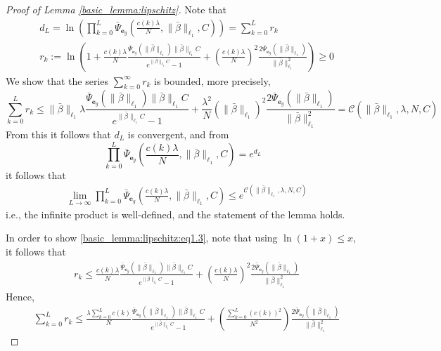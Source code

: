 \documentclass[10pt,a4paper]{amsart}
\def\rve{{\mathbf{e}}}
\begin{document}
\begin{proof}[Proof of Lemma \ref{basic_lemma:lipschitz}]
        Note that 
        \[
        \begin{aligned}
        &  d_L=\ln\left(\prod_{k=0}^{L} \bar{\Psi}_{\rve_g}\left(\frac{c(k) \lambda}{N},\|\bar{\beta}\|_{\ell_1},C\right) \right)=\sum_{k=0}^{L} r_k \\
        & r_k:=\ln \left(1+\frac{c(k) \lambda}{N} \frac{\bar{\Psi}_{\rve_g}(\|\bar{\beta}\|_{\ell_1})\|\bar{\beta}\|_{\ell_1}C}{e^{\|\bar{\beta}\|_{\ell_1}C}-1} + \left(\frac{c(k) \lambda}{N}\right)^2 \frac{2\bar{\Psi}_{\rve_g}(\|\bar{\beta}\|_{\ell_1})}{\|\bar{\beta}\|_{\ell_1}^2} \right) \geq 0
        \end{aligned}
        \]
        We show that the series $\sum_{k=0}^{\infty} r_k$ 
        is bounded, more precisely, 
        \[
        \sum_{k=0}^{L} r_k \le 
      \|\bar{\beta}\|_{\ell_1} \lambda \frac{\bar{\Psi}_{\rve_g}(\|\bar{\beta}\|_{\ell_1})\|\bar{\beta}\|_{\ell_1}C}{e^{\|\bar{\beta}\|_{\ell_1}C}-1} + \frac{\lambda^2}{N} (\|\bar{\beta}\|_{\ell_1})^2 \frac{2\bar{\Psi}_{\rve_g}(\|\bar{\beta}\|_{\ell_1})}{\|\bar{\beta}\|_{\ell_1}^2} = \mathcal{C} (\|\bar{\beta}\|_{\ell_1},\lambda,N,C)
        \]
        From this it follows that $d_L$ is convergent, and from
        \[
      \prod_{k=0}^{ L} \bar{\Psi}_{\rve_g}\left(\frac{c(k) \lambda}{N},\|\bar{\beta}\|_{\ell_1},C\right) = e^{d_L}
        \]
        it follows that  
        \begin{equation}
       \label{basic_lemma:lipschitz:eq1.3}
       \begin{aligned}
        & \lim_{L \rightarrow \infty} 
        \prod_{k=0}^{ L} \bar{\Psi}_{\rve_g}\left(\frac{c(k) \lambda}{N},\|\bar{\beta}\|_{\ell_1},C\right) \le  e^{\mathcal{C}(\|\bar{\beta}\|_{\ell_1},\lambda,N,C)}
       \end{aligned}
        \end{equation}
        i.e., the infinite product is well-defined, and the statement of the lemma holds. 

        In order to show \eqref{basic_lemma:lipschitz:eq1.3}, note that using $\ln(1+x) \le x$, it follows that 
        \[
        \begin{aligned}
      & r_k \le \frac{c(k) \lambda}{N} \frac{\bar{\Psi}_{\rve_g}(\|\bar{\beta}\|_{\ell_1})\|\bar{\beta}\|_{\ell_1}C}{e^{\|\bar{\beta}\|_{\ell_1}C}-1} + \left(\frac{c(k) \lambda}{N}\right)^2 \frac{2\bar{\Psi}_{\rve_g}(\|\bar{\beta}\|_{\ell_1})}{\|\bar{\beta}\|_{\ell_1}^2}
        \end{aligned}
        \]
        Hence,
        \[
        \begin{aligned}
      & \sum_{k=0}^{L} r_k  \le \frac{\lambda \sum_{k=0}^{L}c(k)}{N} \frac{\bar{\Psi}_{\rve_g}(\|\bar{\beta}\|_{\ell_1})\|\bar{\beta}\|_{\ell_1}C}{e^{\|\bar{\beta}\|_{\ell_1}C}-1} +  \left(\frac{\sum_{k=0}^{L} (c(k))^2}{N^2}\right) \frac{2\bar{\Psi}_{\rve_g}(\|\bar{\beta}\|_{\ell_1})}{\|\bar{\beta}\|_{\ell_1}^2}
        \end{aligned}
        \]
        

\end{proof}
\end{document}
